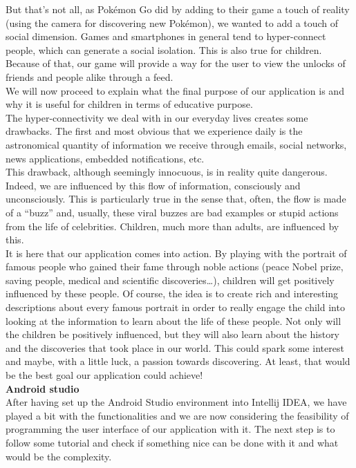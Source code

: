 \documentclass[12pt]{scrartcl}
\begin{document}
	But that’s not all, as Pokémon Go did by adding to their game a touch of reality (using the camera for discovering new Pokémon), we wanted to add a touch of social dimension. Games and smartphones in general tend to hyper-connect people, which can generate a social isolation. This is also true for children. Because of that, our game will provide a way for the user to view the unlocks of friends and people alike through a feed.\\

	We will now proceed to explain what the final purpose of our application is and why it is useful for children in terms of educative purpose.\\ 

	The hyper-connectivity we deal with in our everyday lives creates some drawbacks. The first and most obvious that we experience daily is the astronomical quantity of information we receive through emails, social networks, news applications, embedded notifications, etc.\\ This drawback, although seemingly innocuous, is in reality quite dangerous. Indeed, we are influenced by this flow of information, consciously and unconsciously. This is particularly true in the sense that, often, the flow is made of a ``buzz” and, usually, these viral buzzes are bad examples or stupid actions from the life of celebrities. Children, much more than adults, are influenced by this.\\

	It is here that our application comes into action. By playing with the portrait of famous people who gained their fame through noble actions (peace Nobel prize, saving people, medical and scientific discoveries…), children will get positively influenced by these people. Of course, the idea is to create rich and interesting descriptions about every famous portrait in order to really engage the child into looking at the information to learn about the life of these people. Not only will the children be positively influenced, but they will also learn about the history and the discoveries that took place in our world. This could spark some interest and maybe, with a little luck, a passion towards discovering. At least, that would be the best goal our application could achieve!\\


	\textbf{Android studio}\\

	After having set up the Android Studio environment into Intellij IDEA, we have played a bit with the functionalities and we are now considering the feasibility of programming the user interface of our application with it. The next step is to follow some tutorial and check if something nice can be done with it and what would be the complexity.\\
\end{document}
